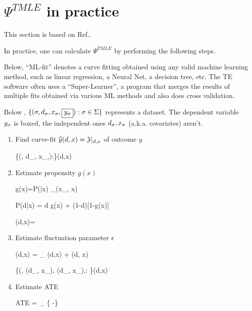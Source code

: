 \section{$\Psi^{TMLE}$ in practice}
This section is based on Ref.\cite{hoff}.

In practice, one can calculate $\Psi^{TMLE}$
by performing the following steps.

Below, \enquote{ML-fit} denotes a curve fitting
obtained using any valid machine learning method,
such as linear regression, a Neural Net, a
decision tree, etc. The TE software
often uses a \enquote{Super-Learner}, a program that
 merges the results of multiple fits
obtained via various ML methods and also does cross validation.

Below , $\{(\sigma, d_\sigma, x_\sigma,\boxed{y_\sigma}):\sigma\in \Sigma\}$
represents a dataset. The dependent variable $y_\sigma$ is boxed,
the independent ones $d_\sigma,x_\sigma$ (a.k.a. covariates) aren't.

\begin{enumerate}
\item Find curve-fit ${\widehat{y}}(d,x)={\cal Y}_{|d,x}$ of outcome $y$

\beq
\{(\s, d_\s, x_\s,):\s\in \Sigma\}\mlarr \haty(d,x)
\eeq

\item Estimate propensity $g(x)$

\beq
g(x)=P(|x)\approx
{}
{\sum_\s \delta(x_\s, x)}
\eeq

\beq
P(d|x) = d g(x) + (1-d)[1-g(x)]
\eeq

\beq
\beta(d,x)=
\eeq

\item Estimate fluctuation parameter $\epsilon$

\beq
\eta(d,x) =
\underbrace{\logit[\haty(d, x)]}_
{\lam(d,x)}
 + \eps \beta(d, x)
\eeq

\beq
\{(\s, \lam(d_\s, x_\s),
\beta(d_\s, x_\s),:
\s\in \Sigma\}\mlarr \HAT{\eta}(d,x)
\eeq

\item Estimate ATE

\beq
ATE =  \sum_\s
\left\{
 \expit[ \HAT{\eta}(d=1,x_\s)]
 -\expit[ \HAT{\eta}(d=0,x_\s)]
 \right\}
\eeq

\end{enumerate}
